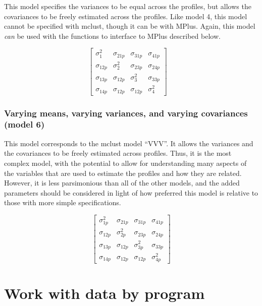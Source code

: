 \documentclass[]{msu-thesis}
\theoremstyle{definition}
\theoremstyle{definition}
\theoremstyle{definition}
\theoremstyle{remark}
\begin{document}
\begin{appendices}
This model specifies the variances to be equal across the profiles, but
allows the covariances to be freely estimated across the profiles. Like
model 4, this model cannot be specified with mclust, though it can be
with MPlus. Again, this model \emph{can} be used with the functions to
interface to MPlus described below.

\[
\left[ \begin{matrix} { \sigma }_{ 1 }^{ 2 } & { \sigma }_{ 21p } & { \sigma }_{ 31p } & { \sigma }_{ 41p } \\ { \sigma }_{ 12p } & { \sigma }_{ 2 }^{ 2 } & { \sigma }_{ 23p } & { \sigma }_{ 24p } \\ { \sigma }_{ 13p } & { \sigma }_{ 12p } & { \sigma }_{ 3 }^{ 2 } & { \sigma }_{ 33p } \\ { \sigma }_{ 14p } & { \sigma }_{ 12p } & { \sigma }_{ 12p } & { \sigma }_{ 4 }^{ 2 } \end{matrix} \right] \quad
\]

\subsection{Varying means, varying variances, and varying covariances
(model
6)}\label{varying-means-varying-variances-and-varying-covariances-model-6}

This model corresponds to the mclust model ``VVV''. It allows the
variances and the covariances to be freely estimated across profiles.
Thus, it is the most complex model, with the potential to allow for
understanding many aspects of the variables that are used to estimate
the profiles and how they are related. However, it is less parsimonious
than all of the other models, and the added parameters should be
considered in light of how preferred this model is relative to those
with more simple specifications.

\[
\left[ \begin{matrix} { \sigma }_{ 1p }^{ 2 } & { \sigma }_{ 21p } & { \sigma }_{ 31p } & { \sigma }_{ 41p } \\ { \sigma }_{ 12p } & { \sigma }_{ 2p }^{ 2 } & { \sigma }_{ 23p } & { \sigma }_{ 24p } \\ { \sigma }_{ 13p } & { \sigma }_{ 12p } & { \sigma }_{ 3p }^{ 2 } & { \sigma }_{ 33p } \\ { \sigma }_{ 14p } & { \sigma }_{ 12p } & { \sigma }_{ 12p } & { \sigma }_{ 4p }^{ 2 } \end{matrix} \right]
\]

\chapter{Work with data by program}


\end{appendices}
\end{document}
